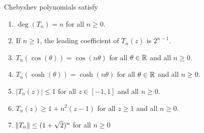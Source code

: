 \begin{proposition}
\label{proposition:properties-of-chebyshev-polynomials}
Chebyshev polynomials satisfy
\begin{enumerate}
\item $\deg(T_n) = n$ for all $n \ge 0$.
\item If $n \ge 1$, the leading coefficient of $T_n(z)$ is $2^{n-1}$.
\item $T_n(\cos(\theta)) = \cos(n \theta)$ for all $\theta \in \mathbb{R}$ and all $n \ge 0$.
\item $T_n(\cosh(\theta)) = \cosh(n \theta)$ for all $\theta \in \mathbb{R}$ and all $n \ge 0$.
\item $|T_n(z)| \le 1$ for all $z \in [-1,1]$ and all $n \ge 0$.
\item $T_n(z) \ge 1 + n^2(z - 1)$ for all $z \ge 1$ and all $n \ge 0$.
\item $\norm{T_n} \le (1+\sqrt{2})^n$ for all $n \ge 0$
\end{enumerate}
\end{proposition}

